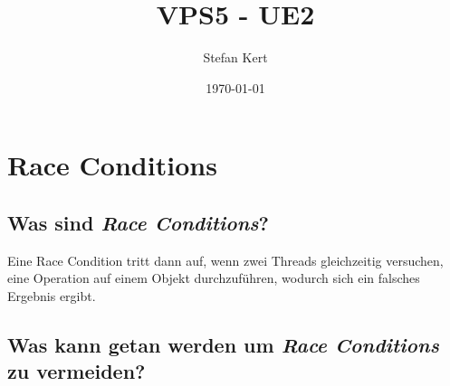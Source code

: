 \documentclass[a4paper,ngerman]{scrartcl}
\begin{document}
\title{VPS5 - UE2}
\author{Stefan Kert}
\date{\today}
\maketitle

\section{Race Conditions}
\subsection{Was sind \textit{Race Conditions}?}
Eine Race Condition tritt dann auf, wenn zwei Threads gleichzeitig versuchen, eine Operation auf einem Objekt durchzuführen, wodurch sich ein falsches Ergebnis ergibt.


\subsection{Was kann getan werden um \textit{Race Conditions} zu vermeiden?}
\end{document}
